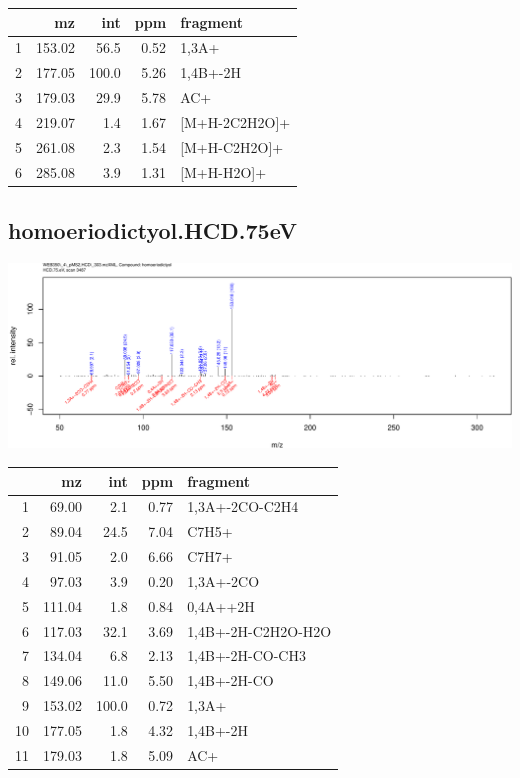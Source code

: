 \documentclass[]{article}
\begin{document}
\begin{table}[ht]
\centering
\begin{tabular}{rrrrl}
  \toprule
 & mz & int & ppm & fragment \\ 
  \midrule
1 & 153.02 & 56.5 & 0.52 & 1,3A+ \\ 
  2 & 177.05 & 100.0 & 5.26 & 1,4B+-2H \\ 
  3 & 179.03 & 29.9 & 5.78 & AC+ \\ 
  4 & 219.07 & 1.4 & 1.67 & [M+H-2C2H2O]+ \\ 
  5 & 261.08 & 2.3 & 1.54 & [M+H-C2H2O]+ \\ 
  6 & 285.08 & 3.9 & 1.31 & [M+H-H2O]+ \\ 
   \bottomrule
\end{tabular}
\end{table}

\clearpage\subsection{homoeriodictyol.HCD.75eV}
\includegraphics[width=\textwidth]{WEB350_files/figure-latex/unnamed-chunk-3-11}

\begin{table}[ht]
\centering
\begin{tabular}{rrrrl}
  \toprule
 & mz & int & ppm & fragment \\ 
  \midrule
1 & 69.00 & 2.1 & 0.77 & 1,3A+-2CO-C2H4 \\ 
  2 & 89.04 & 24.5 & 7.04 & C7H5+ \\ 
  3 & 91.05 & 2.0 & 6.66 & C7H7+ \\ 
  4 & 97.03 & 3.9 & 0.20 & 1,3A+-2CO \\ 
  5 & 111.04 & 1.8 & 0.84 & 0,4A++2H \\ 
  6 & 117.03 & 32.1 & 3.69 & 1,4B+-2H-C2H2O-H2O \\ 
  7 & 134.04 & 6.8 & 2.13 & 1,4B+-2H-CO-CH3 \\ 
  8 & 149.06 & 11.0 & 5.50 & 1,4B+-2H-CO \\ 
  9 & 153.02 & 100.0 & 0.72 & 1,3A+ \\ 
  10 & 177.05 & 1.8 & 4.32 & 1,4B+-2H \\ 
  11 & 179.03 & 1.8 & 5.09 & AC+ \\ 
   \bottomrule
\end{tabular}
\end{table}
\end{document}
